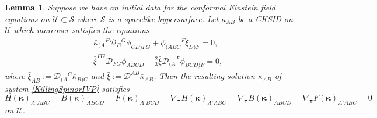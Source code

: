 \documentclass[10pt,a4paper]{article}
\theoremstyle{plain}
\newtheorem{lemma}{Lemma}
\begin{document}
\begin{lemma}\label{Lemma_initial_conditions}
  Suppose we have an initial data for the conformal Einstein field
  equations on $\mathcal{U}\subset\mathcal{S}$ where $\mathcal{S}$ is
  a spacelike hypersurface. Let $\bar{\kappa}_{AB}$ be a CKSID on
  $\mathcal{U}$ which moreover satisfies the equations
\begin{subequations}
\begin{eqnarray}
  && \bar{\kappa}_{(A}{}^{F}\mathcal{D}_{B}{}^{G}\phi_{CD)FG} +
  \phi_{(ABC}{}^{F}\bar{\xi}_{D)F} = 0,\label{RedundantCondition1}\\ &&
  \bar{\xi}^{FG}\mathcal{D}_{FG}\phi_{ABCD} +
  \tfrac{2}{3}\bar{\xi}\mathcal{D}_{(A}{}^F\phi_{BCD)F} =
  0, \label{RedundantCondition2}
\end{eqnarray}
\end{subequations}
where $\bar{\xi}_{AB}:=\mathcal{D}_{(A}{}^C\bar{\kappa}_{B)C}$ and
$\bar{\xi}:=\mathcal{D}^{AB}\bar{\kappa}_{AB}$. Then the resulting
solution $\kappa_{AB}$ of system \eqref{KillingSpinorIVP} satisfies
\[H(\bm\kappa)_{A'ABC}=B(\bm\kappa)_{ABCD}=F(\bm\kappa)_{A'BCD}=\nabla_{\bm\tau}H(\bm\kappa)_{A'ABC}
=\nabla_{\bm\tau}B(\bm\kappa)_{ABCD}=\nabla_{\bm\tau}F(\bm\kappa)_{A'ABC}=0 \]
on $\mathcal{U}$.
\end{lemma}
\end{document}
